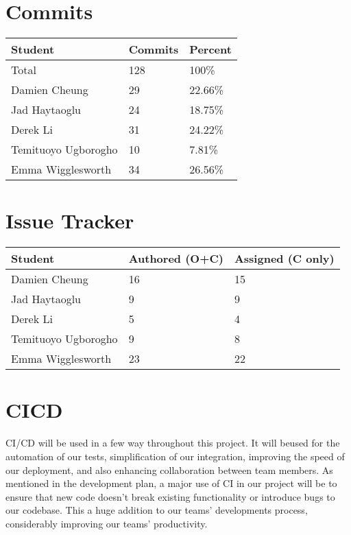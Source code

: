 \documentclass{article}
\begin{document}
\section{Commits}

\begin{table}[H]
\centering
\begin{tabular}{lll}
\toprule
\textbf{Student} & \textbf{Commits} & \textbf{Percent}\\
\midrule
Total & 128 & 100\% \\
Damien Cheung & 29 & 22.66\% \\
Jad Haytaoglu & 24 & 18.75\% \\
Derek Li & 31 & 24.22\% \\
Temituoyo Ugborogho & 10 & 7.81\% \\
Emma Wigglesworth & 34 & 26.56\% \\
\bottomrule
\end{tabular}
\end{table}


\section{Issue Tracker}

\begin{table}[H]
\centering
\begin{tabular}{lll}
\toprule
\textbf{Student} & \textbf{Authored (O+C)} & \textbf{Assigned (C only)}\\
\midrule
Damien Cheung & 16 & 15 \\
Jad Haytaoglu & 9 & 9 \\
Derek Li & 5 & 4 \\
Temituoyo Ugborogho & 9 & 8 \\
Emma Wigglesworth & 23 & 22 \\
\bottomrule
\end{tabular}
\end{table}

\section{CICD}

CI/CD will be used in a few way throughout this project. It will beused for 
the automation of our tests, simplification of our integration, improving the
speed of our deployment, and also enhancing collaboration between team members.
As mentioned in the development plan, a major use of CI in our project will be 
to ensure that new code doesn't break existing functionality or introduce bugs
to our codebase. This a huge addition to our teams' developments process, 
considerably improving our teams' productivity.
\end{document}

